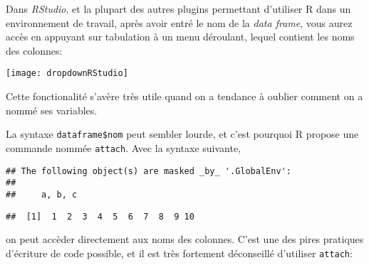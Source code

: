 Dans \emph{RStudio}, et la plupart des autres plugins permettant d'utiliser R dans un environnement de travail, après avoir entré le nom de la \emph{data frame}, vous aurez accès en appuyant sur tabulation à un menu déroulant,
lequel contient les noms des colonnes: 

\begin{center}
\texttt{[image: dropdownRStudio]}
\end{center}

Cette fonctionalité s'avère très utile quand on a tendance à oublier comment on a nommé ses variables.

La syntaxe \texttt{dataframe\$nom} peut sembler lourde, et c'est pourquoi R propose une commande nommée \texttt{attach}.
Avec la syntaxe suivante,

\begin{knitrout}
\color{fgcolor}\begin{kframe}
\begin{flushleft}
\ttfamily\noindent
{}\hlkeyword{(}\hlkeyword{)}\mbox{}
\normalfont
\end{flushleft}
\begin{verbatim}
## The following object(s) are masked _by_ '.GlobalEnv':
## 
##     a, b, c
\end{verbatim}
\begin{flushleft}
\ttfamily\noindent
{}\mbox{}
\normalfont
\end{flushleft}
\begin{verbatim}
##  [1]  1  2  3  4  5  6  7  8  9 10
\end{verbatim}
\begin{flushleft}
\ttfamily\noindent
{}\hlkeyword{(}\hlkeyword{)}\mbox{}
\normalfont
\end{flushleft}
\end{kframe}
\end{knitrout}


\noindent on peut accèder directement aux noms des colonnes.
C'est une des pires pratiques d'écriture de code possible, et il est très fortement déconseillé d'utiliser \texttt{attach}:

